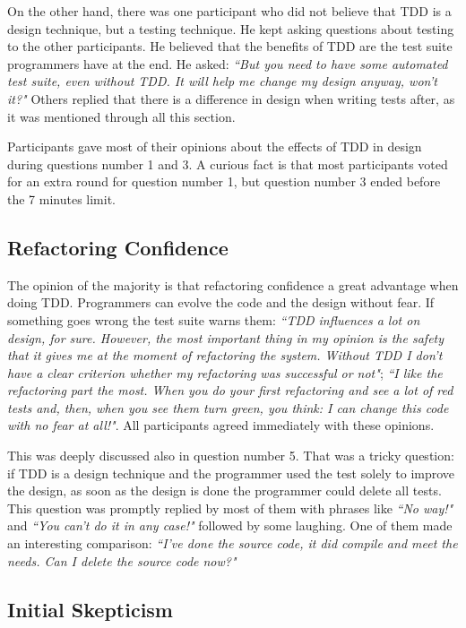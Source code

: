 On the other hand, there was one participant who did not believe that TDD is a
design technique, but a testing technique. He kept asking questions about
testing to the other participants. He believed that the benefits of TDD are the
test suite programmers have at the end. He asked: \textit{``But you need to
have some automated test suite, even without TDD. It will help me change my
design anyway, won't it?"}
Others replied that there is a difference in design when writing tests after,
as it was mentioned through all this section.

Participants gave most of their opinions about the effects of TDD in design 
during questions number 1 and 3. 
A curious fact is that most participants voted for an extra round for
question number 1, but question number 3 ended before the 7 minutes limit.

\subsection{Refactoring Confidence}

The opinion of the majority is that refactoring confidence a great advantage
when doing TDD. Programmers can evolve the code and the design without fear. 
If something goes
wrong the test suite warns them: \textit{``TDD influences a lot on design,
for sure. However, the most important thing in my opinion is the safety that it
gives me at the moment of refactoring the system. Without TDD I don't have a
clear criterion whether my refactoring was successful or not"};
\textit{``I like the refactoring part the most.
When you do your first refactoring and see a lot of red tests and, then, when
you see them turn green, you think: I can change this code with no fear at
all!"}.
All participants agreed immediately with these opinions.

This was deeply discussed also in question number 5. That was a tricky question:
if TDD is a design technique and the programmer used the test solely to improve
the design, as soon as the design is done the programmer could delete all tests.
This question was promptly replied by most of them with phrases like 
\textit{``No way!"} and \textit{``You can't do it in any case!"} followed 
by some laughing. One of them made an interesting comparison: 
\textit{``I've done the source code, it did compile and meet the needs. Can I
delete the source code now?"}

\subsection{Initial Skepticism}

